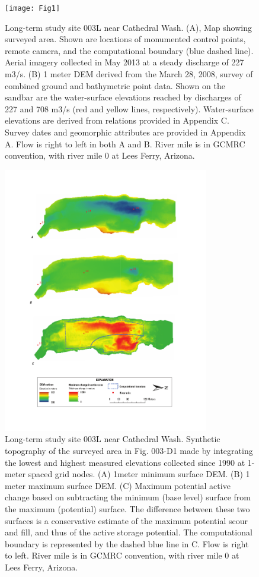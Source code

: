 \graphicspath{{003L/input/}}


\renewcommand{\thefigure}{003L-D\arabic{figure}}
\begin{figure}[H]
	\centering
	\texttt{[image: Fig1]}
	\caption{Long-term study site 003L near Cathedral Wash.  (A), Map showing surveyed area.  Shown are locations of monumented control points, remote camera, and the computational boundary (blue dashed line).  Aerial imagery collected in May 2013 at a steady discharge of 227 m3/s.  (B) 1 meter DEM derived from the March 28, 2008, survey of combined ground and bathymetric point data.  Shown on the sandbar are the water-surface elevations reached by discharges of 227 and 708 m3/s (red and yellow lines, respectively).  Water-surface elevations are derived from relations provided in Appendix C.  Survey dates and geomorphic attributes are provided in Appendix A.  Flow is right to left in both A and B.  River mile is in GCMRC convention, with river mile 0 at Lees Ferry, Arizona.}
\end{figure}


\begin{figure}[H]
	\centering
	\includegraphics[width=0.8\textwidth]{Fig2}
	\caption{Long-term study site 003L near Cathedral Wash. Synthetic topography of the surveyed area in Fig. 003-D1 made by integrating the lowest and highest measured elevations collected since 1990 at 1-meter spaced grid nodes. (A) 1meter minimum surface DEM. (B) 1 meter maximum surface DEM. (C) Maximum potential active change based on subtracting the minimum (base level) surface from the maximum (potential) surface. The difference between these two surfaces is a conservative estimate of the maximum potential scour and fill, and thus of the active storage potential. The computational boundary is represented by the dashed blue line in C. Flow is right to left. River mile is in GCMRC convention, with river mile 0 at Lees Ferry, Arizona.}
\end{figure}


